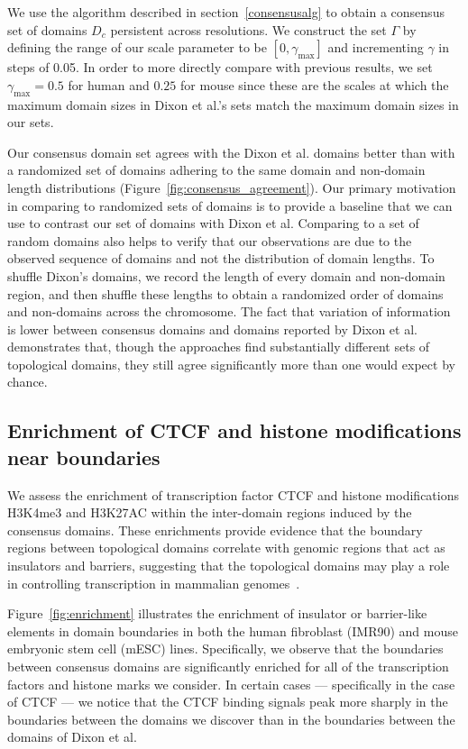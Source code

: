 \documentclass[12pt]{cmuthesis}
\begin{document}
  We use the algorithm described in section~\ref{consensusalg} to obtain a consensus set of domains $D_c$ persistent across resolutions. We construct the set $\Gamma$ by defining the range of our scale parameter to be $[0, \gamma_\textrm{max}]$ and incrementing $\gamma$ in steps of 0.05. In order to more directly compare with previous results, we set $\gamma_{\max}=0.5$ for human and $0.25$ for mouse since these are the scales at which the maximum domain sizes in Dixon et al.'s sets match the maximum domain sizes in our sets.

  Our consensus domain set agrees with the Dixon et al. domains better than with a randomized set of domains adhering to the same domain and non-domain length distributions (Figure~\ref{fig:consensus_agreement}). Our primary motivation in comparing to randomized sets of domains is to provide a baseline that we can use to contrast our set of domains with Dixon et al. Comparing to a set of random domains also helps to verify that our observations are due to the observed sequence of domains and not the distribution of domain lengths. To shuffle Dixon's domains, we record the length of every domain and non-domain region, and then shuffle these lengths to obtain a randomized order of domains and non-domains across the chromosome.  The fact that variation of information is lower between consensus domains and domains reported by Dixon et al. demonstrates that, though the approaches find substantially different sets of topological domains, they still agree significantly more than one would expect by chance.

  \subsection{Enrichment of CTCF and histone modifications near boundaries}
  \label{sec:Enrichment}

  We assess the enrichment of transcription factor CTCF and histone modifications H3K4me3 and H3K27AC within the inter-domain regions induced by the consensus domains. These enrichments provide evidence that the boundary regions between topological domains correlate with genomic regions that act as insulators and barriers, suggesting that the topological domains may play a role in controlling transcription in mammalian genomes~\cite{Dixon2012}.

  Figure~\ref{fig:enrichment} illustrates the enrichment of insulator or barrier-like elements in domain boundaries in both the human fibroblast (IMR90) and mouse embryonic stem cell (mESC) lines.  Specifically, we observe that
  the boundaries between consensus domains are significantly enriched for all of the transcription factors and histone marks we consider.  In certain cases --- specifically in the case of CTCF --- we notice that the CTCF binding signals peak more sharply in the boundaries between the domains we discover than in the boundaries between the domains of Dixon et al.
\end{document}
